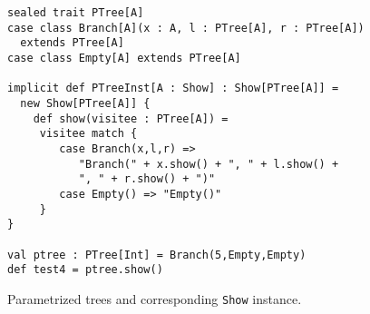 \documentclass[preprint]{sigplanconf}
\begin{document}
\begin{figure}
\begin{lstlisting}	
sealed trait PTree[A]
case class Branch[A](x : A, l : PTree[A], r : PTree[A]) 
  extends PTree[A]
case class Empty[A] extends PTree[A]
	
implicit def PTreeInst[A : Show] : Show[PTree[A]] = 
  new Show[PTree[A]] {
    def show(visitee : PTree[A]) = 
     visitee match {
        case Branch(x,l,r) => 
           "Branch(" + x.show() + ", " + l.show() + 
           ", " + r.show() + ")"
   	    case Empty() => "Empty()"
     }
}
	
val ptree : PTree[Int] = Branch(5,Empty,Empty)
def test4 = ptree.show()
\end{lstlisting}
\caption{Parametrized trees and corresponding \lstinline{Show} instance.}
\end{figure}
\end{document}
